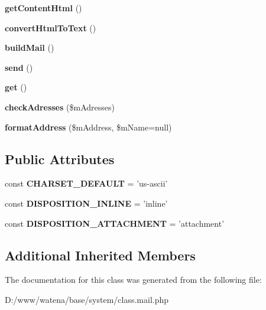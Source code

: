 \begin{DoxyCompactItemize}
\item 
\hypertarget{class_mail_a8f8e71884b817511b6dfc6fe86f9dcb5}{{\bfseries get\-Content\-Html} ()}\label{class_mail_a8f8e71884b817511b6dfc6fe86f9dcb5}

\item 
\hypertarget{class_mail_a6fc5e8b5f1c90c8a520d90535095af2c}{{\bfseries convert\-Html\-To\-Text} ()}\label{class_mail_a6fc5e8b5f1c90c8a520d90535095af2c}

\item 
\hypertarget{class_mail_afa622c1f4545d092db679c513b5d3080}{{\bfseries build\-Mail} ()}\label{class_mail_afa622c1f4545d092db679c513b5d3080}

\item 
\hypertarget{class_mail_a6520941b529c223c1b59ec7544f7f7d6}{{\bfseries send} ()}\label{class_mail_a6520941b529c223c1b59ec7544f7f7d6}

\item 
\hypertarget{class_mail_af424102104285ebfef9cbf49537959c7}{{\bfseries get} ()}\label{class_mail_af424102104285ebfef9cbf49537959c7}

\item 
\hypertarget{class_mail_a03a84ed030aee516a319956c91fefbf7}{{\bfseries check\-Adresses} (\$m\-Adresses)}\label{class_mail_a03a84ed030aee516a319956c91fefbf7}

\item 
\hypertarget{class_mail_a2f29f281a8e937dd6395f4d9315fbbef}{{\bfseries format\-Address} (\$m\-Address, \$m\-Name=null)}\label{class_mail_a2f29f281a8e937dd6395f4d9315fbbef}

\end{DoxyCompactItemize}
\subsection*{Public Attributes}
\begin{DoxyCompactItemize}
\item 
\hypertarget{class_mail_aaa381d615721f1eb18b2131bf0b9d462}{const {\bfseries C\-H\-A\-R\-S\-E\-T\-\_\-\-D\-E\-F\-A\-U\-L\-T} = 'us-\/ascii'}\label{class_mail_aaa381d615721f1eb18b2131bf0b9d462}

\item 
\hypertarget{class_mail_a22c0569d3375e16390d94bae19145500}{const {\bfseries D\-I\-S\-P\-O\-S\-I\-T\-I\-O\-N\-\_\-\-I\-N\-L\-I\-N\-E} = 'inline'}\label{class_mail_a22c0569d3375e16390d94bae19145500}

\item 
\hypertarget{class_mail_a7a1569e286823712e856d071b330d282}{const {\bfseries D\-I\-S\-P\-O\-S\-I\-T\-I\-O\-N\-\_\-\-A\-T\-T\-A\-C\-H\-M\-E\-N\-T} = 'attachment'}\label{class_mail_a7a1569e286823712e856d071b330d282}

\end{DoxyCompactItemize}
\subsection*{Additional Inherited Members}


The documentation for this class was generated from the following file\-:\begin{DoxyCompactItemize}
\item 
D\-:/www/watena/base/system/class.\-mail.\-php\end{DoxyCompactItemize}
